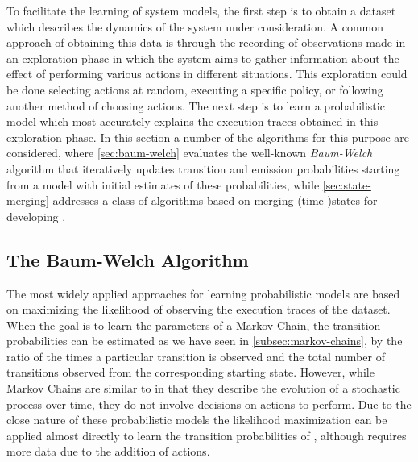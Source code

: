 To facilitate the learning of system models, the first step is to obtain a dataset which describes the dynamics of the system under consideration.
A common approach of obtaining this data is through the recording of observations made in an exploration phase in which the system aims to gather information about the effect of performing various actions in different situations.
This exploration could be done selecting actions at random, executing a specific policy, or following another method of choosing actions.
The next step is to learn a probabilistic model which most accurately explains the execution traces obtained in this exploration phase.
In this section a number of the algorithms for this purpose are considered, where \autoref{sec:baum-welch} evaluates the well-known \textit{Baum-Welch} algorithm that iteratively updates transition and emission probabilities starting from a model with initial estimates of these probabilities, while \autoref{sec:state-merging} addresses a class of algorithms based on merging (time-)states for developing .

\subsection{The Baum-Welch Algorithm}
\label{sec:baum-welch}

The most widely applied approaches for learning probabilistic models are based on maximizing the likelihood of observing the execution traces of the dataset.
When the goal is to learn the parameters of a Markov Chain, the transition probabilities can be estimated as we have seen in \autoref{subsec:markov-chains}, by the ratio of the times a particular transition is observed and the total number of transitions observed from the corresponding starting state.
However, while Markov Chains are similar to  in that they describe the evolution of a stochastic process over time, they do not involve decisions on actions to perform.
Due to the close nature of these probabilistic models the likelihood maximization can be applied almost directly to learn the transition probabilities of , although requires more data due to the addition of actions.

